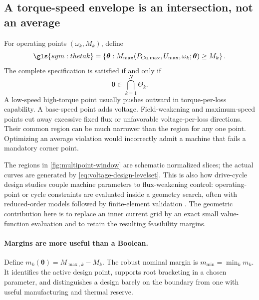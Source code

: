 \subsection{A torque-speed envelope is an intersection, not an average}

For operating points \((\omega_k,M_k)\), define
\begin{equation}
 \gls{sym:thetak}=\left\{\boldsymbol\theta:
 M_{\max}(P_{\mathrm{Cu},\max},U_{\max},\omega_k;
 \boldsymbol\theta)\geq M_k\right\}.
\end{equation}
The complete specification is satisfied if and only if
\begin{equation}
 \boxed{\boldsymbol\theta\in\bigcap_{k=1}^{N}\Theta_k.}
 \label{eq:multipoint-design-intersection}
\end{equation}
A low-speed high-torque point usually pushes outward in torque-per-loss
capability.  A base-speed point adds voltage.  Field-weakening and maximum-speed
points cut away excessive fixed flux or unfavorable voltage-per-loss
directions.  Their common region can be much narrower than the region for any
one point.  Optimizing an average violation would incorrectly admit a machine
that fails a mandatory corner point.



The regions in \cref{fig:multipoint-window} are schematic normalized slices;
the actual curves are generated by \cref{eq:voltage-design-levelset}.  This is
also how drive-cycle design studies couple machine parameters to flux-weakening
control: operating-point or cycle constraints are evaluated inside a geometry
search, often with reduced-order models followed by finite-element validation
\cite{dang2017,parasiliti2012}.  The geometric contribution here is to replace
an inner current grid by an exact small value-function evaluation and to retain
the resulting feasibility margins.

\paragraph{Margins are more useful than a Boolean.}
Define \(m_k(\boldsymbol\theta)=M_{\max,k}-M_k\).  The robust nominal margin
is \(m_{\min}=\min_k m_k\).  It identifies the active design point, supports
root bracketing in a chosen parameter, and distinguishes a design barely on
the boundary from one with useful manufacturing and thermal reserve.

